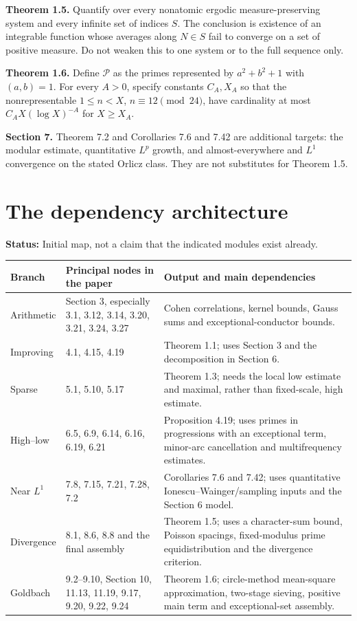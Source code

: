 \documentclass[11pt]{article}
\newcommand{\status}[1]{\textbf{Status:} #1.}
\newcommand{\page}{\newpage}
\begin{document}
\textbf{Theorem 1.5.} Quantify over every nonatomic ergodic measure-preserving
system and every infinite set of indices \(S\). The conclusion is existence of an
integrable function whose averages along \(N\in S\) fail to converge on a set of
positive measure. Do not weaken this to one system or to the full sequence only.

\textbf{Theorem 1.6.} Define \(\mathcal P\) as the primes represented by
\(a^2+b^2+1\) with \((a,b)=1\). For every \(A>0\), specify constants \(C_A,X_A\)
so that the nonrepresentable \(1\le n<X\), \(n\equiv12\pmod{24}\), have cardinality
at most \(C_AX(\log X)^{-A}\) for \(X\ge X_A\).

\textbf{Section 7.} Theorem 7.2 and Corollaries 7.6 and 7.42 are additional targets:
the modular estimate, quantitative \(L^p\) growth, and almost-everywhere and \(L^1\)
convergence on the stated Orlicz class. They are not substitutes for Theorem 1.5.

\page
\section{The dependency architecture}
\status{Initial map, not a claim that the indicated modules exist already}

\begin{longtable}{p{.15\linewidth}p{.36\linewidth}p{.40\linewidth}}
\toprule
Branch & Principal nodes in the paper & Output and main dependencies\\\midrule
Arithmetic & Section 3, especially 3.1, 3.12, 3.14, 3.20, 3.21, 3.24, 3.27 &
Cohen correlations, kernel bounds, Gauss sums and exceptional-conductor bounds.\\
Improving & 4.1, 4.15, 4.19 &
Theorem 1.1; uses Section 3 and the decomposition in Section 6.\\
Sparse & 5.1, 5.10, 5.17 &
Theorem 1.3; needs the local low estimate and maximal, rather than fixed-scale,
high estimate.\\
High--low & 6.5, 6.9, 6.14, 6.16, 6.19, 6.21 &
Proposition 4.19; uses primes in progressions with an exceptional term, minor-arc
cancellation and multifrequency estimates.\\
Near \(L^1\) & 7.8, 7.15, 7.21, 7.28, 7.2 &
Corollaries 7.6 and 7.42; uses quantitative Ionescu--Wainger/sampling inputs and
the Section 6 model.\\
Divergence & 8.1, 8.6, 8.8 and the final assembly &
Theorem 1.5; uses a character-sum bound, Poisson spacings, fixed-modulus prime
equidistribution and the divergence criterion.\\
Goldbach & 9.2--9.10, Section 10, 11.13, 11.19, 9.17, 9.20, 9.22, 9.24 &
Theorem 1.6; circle-method mean-square approximation, two-stage sieving,
positive main term and exceptional-set assembly.\\\bottomrule
\end{longtable}
\end{document}
